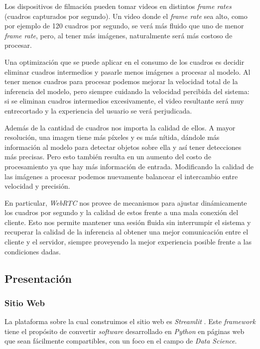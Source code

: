 \documentclass[a4paper]{article}
\begin{document}
Los dispositivos de filmación pueden tomar videos en distintos \textit{frame rates} (cuadros capturados por segundo). Un video donde el \textit{frame rate} sea alto, como por ejemplo de 120 cuadros por segundo, se verá más fluido que uno de menor \textit{frame rate}, pero, al tener más imágenes, naturalmente será más costoso de procesar.

Una optimización que se puede aplicar en el consumo de los cuadros es decidir eliminar cuadros intermedios y pasarle menos imágenes a procesar al modelo. Al tener menos cuadros para procesar podemos mejorar la velocidad total de la inferencia del modelo, pero siempre cuidando la velocidad percibida del sistema: si se eliminan cuadros intermedios excesivamente, el video resultante será muy entrecortado y la experiencia del usuario se verá perjudicada.

Además de la cantidad de cuadros nos importa la calidad de ellos. A mayor resolución, una imagen tiene más píxeles y es más nítida, dándole más información al modelo para detectar objetos sobre ella y así tener detecciones más precisas. Pero esto también resulta en un aumento del costo de procesamiento ya que hay más información de entrada. Modificando la calidad de las imágenes a procesar podemos nuevamente balancear el intercambio entre velocidad y precisión. \medskip

En particular, \textit{WebRTC} nos provee de mecanismos para ajustar dinámicamente los cuadros por segundo y la calidad de estos frente a una mala conexión del cliente. Esto nos permite mantener una sesión fluida sin interrumpir el sistema y recuperar la calidad de la inferencia al obtener una mejor comunicación entre el cliente y el servidor, siempre proveyendo la mejor experiencia posible frente a las condiciones dadas.

\subsection{Presentación}

\subsubsection{Sitio Web}

La plataforma sobre la cual construimos el sitio web es \textit{Streamlit} \cite{streamlit}. Este \textit{framework} tiene el propósito de convertir \textit{software} desarrollado en \textit{Python} en páginas web que sean fácilmente compartibles, con un foco en el campo de \textit{Data Science}.
\end{document}
